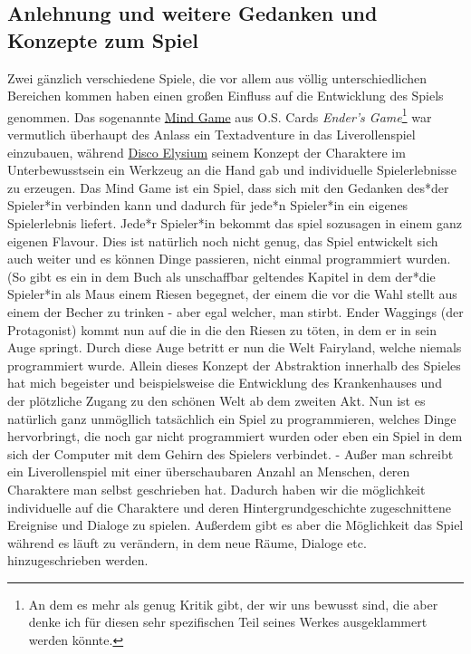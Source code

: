 \documentclass[a4paper, 12pt]{scrartcl}
\begin{document}
    \subsection{Anlehnung und weitere Gedanken und Konzepte zum Spiel}\label{txtad-anlehnung}
    Zwei gänzlich verschiedene Spiele, die vor allem aus völlig unterschiedlichen Bereichen kommen haben einen großen Einfluss auf die Entwicklung des Spiels genommen.
     Das sogenannte \glqq \href{https://enderverse.fandom.com/wiki/Mind_Game}{Mind Game}\grqq{} aus O.S. Cards \textit{Ender's Game}\footnote{An dem es mehr als genug Kritik gibt, der wir uns bewusst sind, die aber denke ich für diesen sehr spezifischen Teil seines Werkes ausgeklammert werden könnte.} war vermutlich überhaupt des Anlass ein Textadventure in das Liverollenspiel einzubauen, während \glqq \href{https://www.pcgames.de/Disco-Elysium-Spiel-72334/Tests/Review-Wertung-zaum-adventure-Rollenspiel-rpg-1336586/}{Disco Elysium}\grqq{} seinem Konzept der Charaktere im Unterbewusstsein ein Werkzeug an die Hand gab und individuelle Spielerlebnisse zu erzeugen.
    Das Mind Game ist ein Spiel, dass sich mit den Gedanken des*der Spieler*in verbinden kann und dadurch für jede*n Spieler*in ein eigenes Spielerlebnis liefert. 
    Jede*r Spieler*in bekommt das spiel sozusagen in einem ganz eigenen Flavour. 
    Dies ist natürlich noch nicht genug, das Spiel entwickelt sich auch weiter und es können Dinge passieren, nicht einmal programmiert wurden.
    (So gibt es ein in dem Buch als unschaffbar geltendes Kapitel in dem der*die Spieler*in als Maus einem Riesen begegnet, der einem die vor die Wahl stellt aus einem der Becher zu trinken - aber egal welcher, man stirbt. 
    Ender Waggings (der Protagonist) kommt nun auf die in die den Riesen zu töten, in dem er in sein Auge springt.
    Durch diese Auge betritt er nun die Welt \glqq Fairyland\grqq{}, welche niemals programmiert wurde.
    Allein dieses Konzept der Abstraktion innerhalb des Spieles hat mich begeister und beispielsweise die Entwicklung des Krankenhauses und der plötzliche Zugang zu den schönen Welt ab dem zweiten Akt. 
    Nun ist es natürlich ganz unmögllich tatsächlich ein Spiel zu programmieren, welches Dinge hervorbringt, die noch gar nicht programmiert wurden oder eben ein Spiel in dem sich \glqq der Computer mit dem Gehirn des Spielers verbindet\grqq .
    - Außer man schreibt ein Liverollenspiel mit einer überschaubaren Anzahl an Menschen, deren Charaktere man selbst geschrieben hat. 
    Dadurch haben wir die möglichkeit individuelle auf die Charaktere und deren Hintergrundgeschichte zugeschnittene Ereignise und Dialoge zu spielen. 
    Außerdem gibt es aber die Möglichkeit das Spiel während es läuft zu verändern, in dem neue Räume, Dialoge etc. hinzugeschrieben werden. 
    
\end{document}

